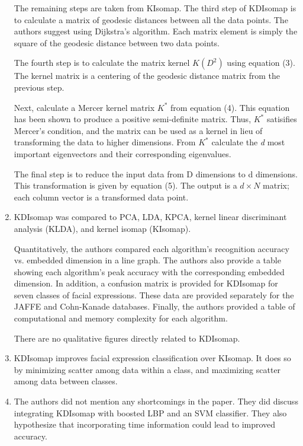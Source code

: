 \documentclass[11pt]{article}
\begin{document}
\begin{enumerate}
        The remaining steps are taken from KIsomap. The third step of KDIsomap
        is to calculate a matrix of geodesic distances between all the data
        points. The authors suggest using Dijkstra's algorithm. Each matrix
        element is simply the square of the geodesic distance between two data
        points.

        The fourth step is to calculate the matrix kernel \(K(D^2)\) using
        equation (3). The kernel matrix is a centering of the geodesic distance
        matrix from the previous step.

        Next, calculate a Mercer kernel matrix \(K^*\) from equation (4). This
        equation has been shown to produce a positive semi-definite matrix.
        Thus, \(K^*\) satisifies Mercer's condition, and the matrix can be used
        as a kernel in lieu of transforming the data to higher dimensions. From
        \(K^*\) calculate the \emph{d} most important eigenvectors and their
        corresponding eigenvalues.

        The final step is to reduce the input data from D dimensions to d
        dimensions. This transformation is given by equation (5). The output is
        a \(d \times N\) matrix; each column vector is a transformed data point.

    \item KDIsomap was compared to PCA, LDA, KPCA, kernel linear discriminant
        analysis (KLDA), and kernel isomap (KIsomap).

        Quantitatively, the authors compared each algorithm's recognition
        accuracy vs. embedded dimension in a line graph. The authors also
        provide a table showing each algorithm's peak accuracy with the
        corresponding embedded dimension. In addition, a confusion matrix is
        provided for KDIsomap for seven classes of facial expressions. These
        data are provided separately for the JAFFE and Cohn-Kanade databases.
        Finally, the authors provided a table of computational and memory
        complexity for each algorithm.

        There are no qualitative figures directly related to KDIsomap.

    \item KDIsomap improves facial expression classification over KIsomap. It
        does so by minimizing scatter among data within a class, and maximizing
        scatter among data between classes.

    \item The authors did not mention any shortcomings in the paper. They did
        discuss integrating KDIsomap with boosted LBP and an SVM classifier.
        They also hypothesize that incorporating time information could lead to
        improved accuracy.


\end{enumerate}
\end{document}
